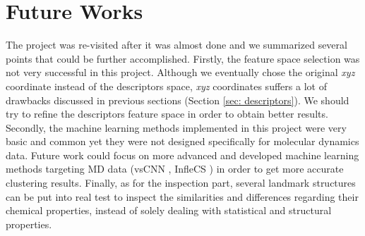 \documentclass[a4paper]{article}
\begin{document}
\section{Future Works}
The project was re-visited after it was almost done and we summarized several points that could be further accomplished. Firstly, the feature space selection was not very successful in this project. Although we eventually chose the original \textit{xyz} coordinate instead of the descriptors space, \textit{xyz} coordinates suffers a lot of drawbacks discussed in previous sections (Section \ref{sec: descriptors}). We should try to refine the descriptors feature space in order to obtain better results. Secondly, the machine learning methods implemented in this project were very basic and common yet they were not designed specifically for molecular dynamics data. Future work could focus on more advanced and developed machine learning methods targeting MD data (vsCNN \cite{vsCNN}, InfleCS \cite{InfleCS}) in order to get more accurate clustering results. Finally, as for the inspection part, several landmark structures can be put into real test to inspect the similarities and differences regarding their chemical properties, instead of solely dealing with statistical and structural properties.

\pagebreak


\end{document}
